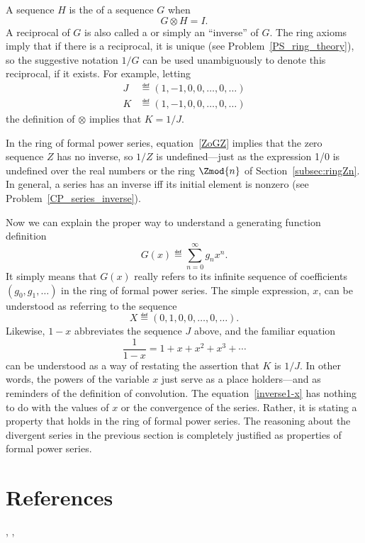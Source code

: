 A sequence $H$ is the  of a sequence $G$ when
\[
G \otimes H = I.
\]
A reciprocal of $G$ is also called a  or
simply an ``inverse'' of $G$.  The ring axioms imply that if there is
a reciprocal, it is unique (see Problem~\ref{PS_ring_theory}), so the
suggestive notation $1/G$ can be used unambiguously to denote this
reciprocal, if it exists.  For example, letting
\begin{align*}
J & \eqdef (1,-1,0,0,\dots,0,\dots)\\
K & \eqdef (1,-1,0,0,\dots,0,\dots)
\end{align*}
the definition of $\otimes$ implies that $K = 1/J$.

In the ring of formal power series, equation~\eqref{ZoGZ} implies that
the zero sequence $Z$ has no inverse, so $1/Z$ is undefined---just as
the expression 1/0 is undefined over the real numbers or the ring
$\Zmod{n}$ of Section~\ref{subsec:ringZn}.  In general, a series has
an inverse iff its initial element is nonzero (see
Problem~\ref{CP_series_inverse}).

Now we can explain the proper way to understand a generating function
definition
\[
G(x) \eqdef \sum_{n=0}^\infty g_n x^n.
\]
It simply means that $G(x)$ really refers to its infinite sequence of
coefficients $(g_0,g_1,\dots)$ in the ring of formal power series.  The
simple expression, $x$, can be understood as referring to the sequence
\[
X \eqdef (0,1,0,0,\dots,0,\dots).
\]
Likewise, $1-x$ abbreviates the sequence $J$ above, and the familiar
equation
\begin{equation}\label{inverse1-x}
\frac{1}{1-x} = 1 + x + x^2 + x^3 + \cdots
\end{equation}
can be understood as a way of restating the assertion that $K$ is
$1/J$.  In other words, the powers of the variable $x$ just serve as a
place holders---and as reminders of the definition of convolution.
The equation~\eqref{inverse1-x} has nothing to do with the values of
$x$ or the convergence of the series.  Rather, it is stating a
property that holds in the ring of formal power series.  The reasoning
about the divergent series in the previous section is completely
justified as properties of formal power series.

\begin{problems}
\practiceproblems
{}

\classproblems
{}
\end{problems}

\section{References}
\cite{Wilf1990},
\cite{GrahamKP1994},
\cite{MR2359513}      %
\cite{Flajolet2009}

\endinput

